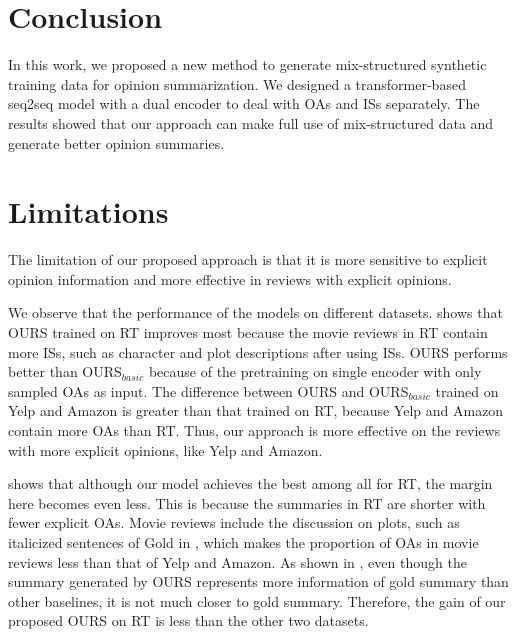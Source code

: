 \section{Conclusion}
\label{sec:conclude}
In this work,
we proposed a new method to generate
mix-structured synthetic training data for 
opinion summarization.
We designed a transformer-based seq2seq model with a dual encoder
to deal with OAs and ISs separately.
The results showed that
our approach can make full use of mix-structured data
and generate better opinion summaries.


\section{Limitations}
The limitation of our proposed approach is that it is more sensitive to explicit opinion information and more effective in reviews with explicit opinions.

We observe that 
the performance of the models on different datasets.
 shows that
OURS trained on RT improves most because the movie reviews in RT contain more ISs, such as character and plot descriptions after using ISs.
OURS performs better than OURS$_{basic}$ because of the pretraining on single encoder with only sampled OAs as input.
The difference between OURS and OURS$_{basic}$ trained on Yelp and Amazon is greater than that trained on RT, 
because Yelp and Amazon contain more OAs than RT.
Thus, our approach is more effective on the reviews with more explicit opinions, like Yelp and Amazon.
 
 shows that although our model achieves the best among all for RT, the margin here becomes even less.
This is because the summaries in RT are shorter with fewer explicit OAs.
Movie reviews include the discussion on plots, such as italicized sentences of Gold in ,
which makes the proportion of OAs in movie reviews less than that of Yelp and Amazon.
As shown in , even though the summary generated by OURS represents more information of gold summary than other baselines,
it is not much closer to gold summary. 
Therefore, the gain of our proposed OURS on RT is less than the other two datasets.

